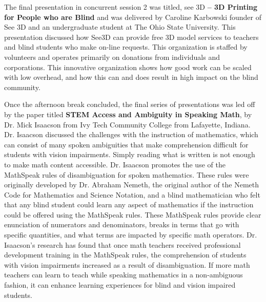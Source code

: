 \documentclass[11.5pt]{sig-alternate}
\begin{document}
\begin{large}
The final presentation in concurrent session 2 was titled, see 3D \textbf{– 3D Printing for People who are Blind} and was delivered by Caroline Karbowski founder of See 3D and an undergraduate student at The Ohio State University. This presentation discussed how See3D can provide free 3D model services to teachers and blind students who make on-line requests. This organization is staffed by volunteers and operates primarily on donations from individuals and corporations. This innovative organization shows how good work can be scaled with low overhead, and how this can and does result in high impact on the blind community.

Once the afternoon break concluded, the final series of presentations was led off by the paper titled \textbf{STEM Access and Ambiguity in Speaking Math}, by Dr. Mick Isaacson from Ivy Tech Community College from Lafayette, Indiana. Dr. Isaacson discussed the challenges with the instruction of mathematics, which can consist of many spoken ambiguities that make comprehension difficult for students with vision impairments. Simply reading what is written is not enough to make math content accessible. Dr. Isaacson promotes the use of the MathSpeak rules of disambiguation for spoken mathematics. These rules were originally developed by Dr. Abraham Nemeth, the original author of the Nemeth Code for Mathematics and Science Notation, and a blind mathematician who felt that any blind student could learn any aspect of mathematics if the instruction could be offered using the MathSpeak rules. These MathSpeak rules provide clear enunciation of numerators and denominators, breaks in terms that go with specific quantities, and what terms are impacted by specific math operators. Dr. Isaacson’s research has found that once math teachers received professional development training in the MathSpeak rules, the comprehension of students with vision impairments increased as a result of disambiguation. If more math teachers can learn to teach while speaking mathematics in a non-ambiguous fashion, it can enhance learning experiences for blind and vision impaired students.


\end{large}
\end{document}

